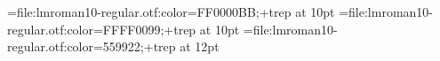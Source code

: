 

\font\testa=file:lmroman10-regular.otf:color=FF0000BB;+trep at 10pt
\font\testb=file:lmroman10-regular.otf:color=FFFF0099;+trep at 10pt
\font\testc=file:lmroman10-regular.otf:color=559922;+trep   at 12pt

\testa  \par
\testb  \par
\testc  \par
\bye
